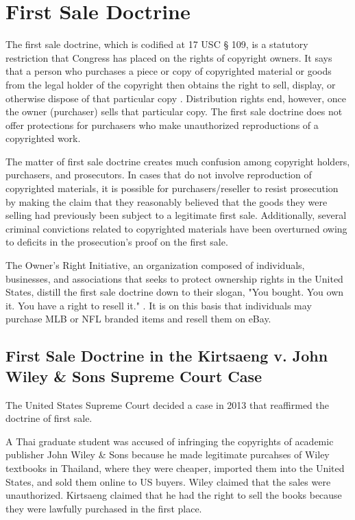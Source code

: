 \documentclass[letterpaper,11pt]{texMemo}
\begin{document}
\section*{First Sale Doctrine}
The first sale doctrine, which is codified at 17 USC § 109, is a statutory restriction that Congress has placed on the rights of copyright owners. It says that a person who purchases a piece or copy of copyrighted material or goods from the legal holder of the copyright then obtains the right to sell, display, or otherwise dispose of that particular copy \cite{17usc109}. Distribution rights end, however, once the owner (purchaser) sells that particular copy. The first sale doctrine does not offer protections for purchasers who make unauthorized reproductions of a copyrighted work.

The matter of first sale doctrine creates much confusion among copyright holders, purchasers, and prosecutors. In cases that do not involve reproduction of copyrighted materials, it is possible for purchasers/reseller to resist prosecution by making the claim that they reasonably believed that the goods they were selling had previously been subject to a legitimate first sale. Additionally, several criminal convictions related to copyrighted materials have been overturned owing to deficits in the prosecution's proof on the first sale.

The Owner's Right Initiative, an organization composed of individuals, businesses, and associations that seeks to protect ownership rights in the United States, distill the first sale doctrine down to their slogan, "You bought. You own it. You have a right to resell it." \cite{ownersrights}. It is on this basis that individuals may purchase MLB or NFL branded items and resell them on eBay.

  \subsection*{First Sale Doctrine in the Kirtsaeng v. John Wiley \& Sons Supreme Court Case}
  The United States Supreme Court decided a case in 2013 that reaffirmed the doctrine of first sale.

  A Thai graduate student was accused of infringing the copyrights of academic publisher John Wiley \& Sons because he made legitimate purcahses of Wiley textbooks in Thailand, where they were cheaper, imported them into the United States, and sold them online to US buyers. Wiley claimed that the sales were unauthorized. Kirtsaeng claimed that he had the right to sell the books because they were lawfully purchased in the first place.
\end{document}
